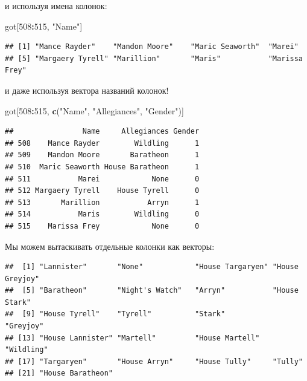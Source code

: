 \documentclass[]{book}
\newenvironment{Shaded}{\begin{snugshade}}{\end{snugshade}}
\newcommand{\KeywordTok}[1]{\textcolor[rgb]{0.13,0.29,0.53}{\textbf{#1}}}
\newcommand{\DecValTok}[1]{\textcolor[rgb]{0.00,0.00,0.81}{#1}}
\newcommand{\StringTok}[1]{\textcolor[rgb]{0.31,0.60,0.02}{#1}}
\newcommand{\CommentTok}[1]{\textcolor[rgb]{0.56,0.35,0.01}{\textit{#1}}}
\newcommand{\OperatorTok}[1]{\textcolor[rgb]{0.81,0.36,0.00}{\textbf{#1}}}
\newcommand{\NormalTok}[1]{#1}
\begin{document}
и используя имена колонок:

\begin{Shaded}
\begin{Highlighting}[]
\NormalTok{got[}\DecValTok{508}\OperatorTok{:}\DecValTok{515}\NormalTok{, }\StringTok{"Name"}\NormalTok{]}
\end{Highlighting}
\end{Shaded}

\begin{verbatim}
## [1] "Mance Rayder"    "Mandon Moore"    "Maric Seaworth"  "Marei"          
## [5] "Margaery Tyrell" "Marillion"       "Maris"           "Marissa Frey"
\end{verbatim}

и даже используя вектора названий колонок!

\begin{Shaded}
\begin{Highlighting}[]
\NormalTok{got[}\DecValTok{508}\OperatorTok{:}\DecValTok{515}\NormalTok{, }\KeywordTok{c}\NormalTok{(}\StringTok{"Name"}\NormalTok{, }\StringTok{"Allegiances"}\NormalTok{, }\StringTok{"Gender"}\NormalTok{)]}
\end{Highlighting}
\end{Shaded}

\begin{verbatim}
##                Name     Allegiances Gender
## 508    Mance Rayder        Wildling      1
## 509    Mandon Moore       Baratheon      1
## 510  Maric Seaworth House Baratheon      1
## 511           Marei            None      0
## 512 Margaery Tyrell    House Tyrell      0
## 513       Marillion           Arryn      1
## 514           Maris        Wildling      0
## 515    Marissa Frey            None      0
\end{verbatim}

Мы можем вытаскивать отдельные колонки как векторы:

\begin{Shaded}
\end{Shaded}

\begin{verbatim}
##  [1] "Lannister"       "None"            "House Targaryen" "House Greyjoy"  
##  [5] "Baratheon"       "Night's Watch"   "Arryn"           "House Stark"    
##  [9] "House Tyrell"    "Tyrell"          "Stark"           "Greyjoy"        
## [13] "House Lannister" "Martell"         "House Martell"   "Wildling"       
## [17] "Targaryen"       "House Arryn"     "House Tully"     "Tully"          
## [21] "House Baratheon"
\end{verbatim}
\end{document}
